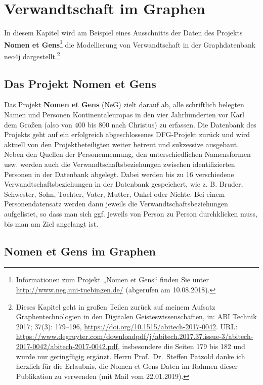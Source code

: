 \documentclass[ngerman,]{scrreprt}
\begin{document}
\hypertarget{verwandtschaft-im-graphen}{%
\chapter{Verwandtschaft im Graphen}\label{verwandtschaft-im-graphen}}

In diesem Kapitel wird am Beispiel eines Ausschnitts der Daten des Projekts \textbf{Nomen et Gens}\footnote{Informationen zum Projekt „Nomen et Gens`` finden Sie unter \url{http://www.neg.uni-tuebingen.de/} (abgerufen am 10.08.2018).} die Modellierung von Verwandtschaft in der Graphdatenbank neo4j dargestellt.\footnote{Dieses Kapitel geht in großen Teilen zurück auf meinem Aufsatz Graphentechnologien in den Digitalen Geisteswissenschaften, in: ABI Technik 2017; 37(3): 179--196, \url{https://doi.org/10.1515/abitech-2017-0042}. URL: \url{https://www.degruyter.com/downloadpdf/j/abitech.2017.37.issue-3/abitech-2017-0042/abitech-2017-0042.pdf}, insbesondere die Seiten 179 bis 182 und wurde nur geringfügig ergänzt. Herrn Prof.~Dr.~Steffen Patzold danke ich herzlich für die Erlaubnis, die Nomen et Gens Daten im Rahmen dieser Publikation zu verwenden (mit Mail vom 22.01.2019).}

\hypertarget{das-projekt-nomen-et-gens}{%
\section{Das Projekt Nomen et Gens}\label{das-projekt-nomen-et-gens}}

Das Projekt \textbf{Nomen et Gens} (NeG) zielt darauf ab, alle schriftlich belegten Namen und Personen Kontinentaleuropas in den vier Jahrhunderten vor Karl dem Großen (also von 400 bis 800 nach Christus) zu erfassen. Die Datenbank des Projekts geht auf ein erfolgreich abgeschlossenes DFG-Projekt zurück und wird aktuell von den Projektbeteiligten weiter betreut und sukzessive ausgebaut. Neben den Quellen der Personennennung, den unterschiedlichen Namensformen usw. werden auch die Verwandtschaftsbeziehungen zwischen identifizierten Personen in der Datenbank abgelegt. Dabei werden bis zu 16 verschiedene Verwandtschaftsbeziehungen in der Datenbank gespeichert, wie z. B. Bruder, Schwester, Sohn, Tochter, Vater, Mutter, Onkel oder Nichte. Bei einem Personendatensatz werden dann jeweils die Verwandtschaftsbeziehungen aufgelistet, so dass man sich ggf. jeweils von Person zu Person durchklicken muss, bis man am Ziel angelangt ist.

\hypertarget{nomen-et-gens-im-graphen}{%
\section{Nomen et Gens im Graphen}\label{nomen-et-gens-im-graphen}}
\end{document}
